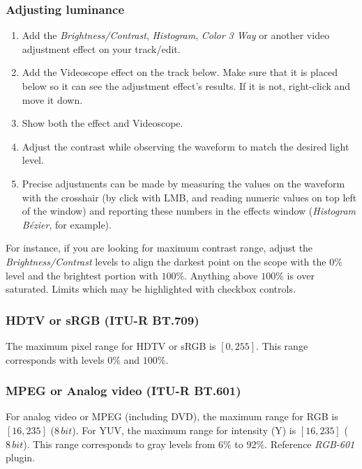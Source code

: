 \subsubsection*{Adjusting luminance}%
\label{ssub:adjusting_luminance}

\begin{enumerate}
    \item Add the \textit{Brightness/Contrast}, \textit{Histogram}, \textit{Color 3 Way} or another video adjustment effect on your track/edit.
    \item Add the Videoscope effect on the track below. Make sure that it is placed below so it can see the adjustment effect's results. If it is not, right-click and move it down.
    \item Show both the effect and Videoscope.
    \item Adjust the contrast while observing the waveform to match the desired light level.
    \item Precise adjustments can be made by measuring the values on the waveform with the crosshair (by click with LMB, and reading numeric values on top left of the window) and reporting these numbers in the effects window (\textit{Histogram Bézier}, for example).
\end{enumerate}

For instance, if you are looking for maximum contrast range, adjust the \textit{Brightness/Contrast} levels to align the darkest point on the scope with the $0\%$ level and the brightest portion with $100\%$. Anything above $100\%$ is over saturated. Limits which may be highlighted with checkbox controls.

\subsubsection*{HDTV or sRGB (ITU-R BT.709)}%
\label{ssub:hdtv_srgb_bt709}

The maximum pixel range for HDTV or sRGB is $[0, 255]$. This range corresponds with levels $0\%$ and $100\%$.

\subsubsection*{MPEG or Analog video (ITU-R BT.601)}%
\label{ssub:mpeg_analog_video_bt601}

For analog video or MPEG (including DVD), the maximum range for RGB is $[16, 235]$ ($8\, bit$). For YUV, the maximum range for intensity (Y) is $[16, 235]$ ($8\, bit$). This range corresponds to gray levels from $6\%$ to $92\%$. Reference \textit{RGB-601} plugin.

